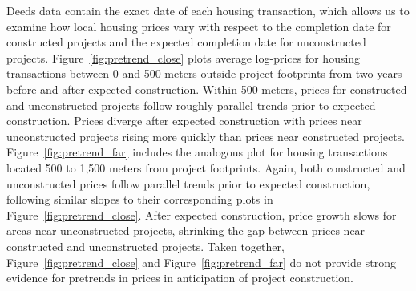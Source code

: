 \documentclass[12pt]{article}
\begin{document}
Deeds data contain the exact date of each housing transaction, which allows us to examine how local housing prices vary with respect to the completion date for constructed projects and the expected completion date for unconstructed projects.  Figure~\ref{fig:pretrend_close} plots average log-prices for housing transactions between 0 and 500 meters outside project footprints from two years before and after expected construction.  Within 500 meters, prices for constructed and unconstructed projects follow roughly parallel trends prior to expected construction.  Prices diverge after expected construction with prices near unconstructed projects rising more quickly than prices near constructed projects.  Figure~\ref{fig:pretrend_far} includes the analogous plot for housing transactions located 500 to 1,500 meters from project footprints.  Again, both constructed and unconstructed prices follow parallel trends prior to expected construction, following similar slopes to their corresponding plots in Figure~\ref{fig:pretrend_close}.  After expected construction, price growth slows for areas near unconstructed projects, shrinking the gap between prices near constructed and unconstructed projects.  Taken together, Figure~\ref{fig:pretrend_close} and Figure~\ref{fig:pretrend_far} do not provide strong evidence for pretrends in prices in anticipation of project construction. 


\end{document}

